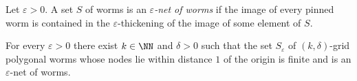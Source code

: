 \begin{definition}
    \label{def:epsilonNet}
    Let $\varepsilon > 0$. A set $S$ of worms is an \emph{$\varepsilon$-net of
    worms} if the image of every pinned worm is contained in the
    $\varepsilon$-thickening of the image of some element of $S$.
\end{definition}

\begin{theorem}
    \label{thm:finiteEpsilonNet}
    For every $\varepsilon > 0$ there exist $k \in \NN$ and $\delta > 0$ such
    that the set $S_\varepsilon$ of $(k,\delta)$-grid polygonal worms whose
    nodes lie within distance $1$ of the origin is finite and is an
    $\varepsilon$-net of worms.
\end{theorem}
